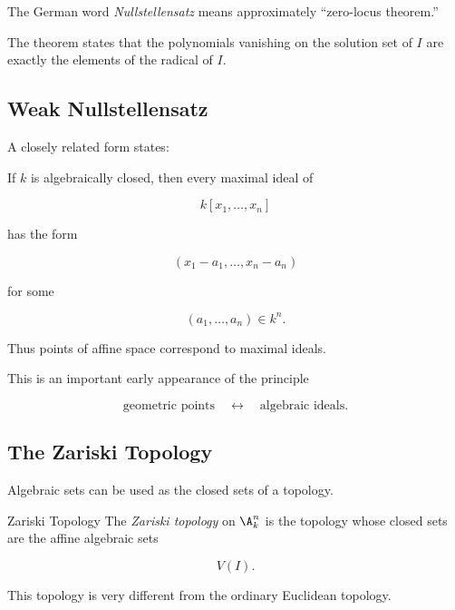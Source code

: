 The German word \emph{Nullstellensatz} means approximately ``zero-locus
theorem.''

The theorem states that the polynomials vanishing on the solution set of
\(I\) are exactly the elements of the radical of \(I\).

\subsection{Weak Nullstellensatz}
\label{subsec:weak-nullstellensatz}

A closely related form states:

\begin{theorem}
If \(k\) is algebraically closed, then every maximal ideal of

\[
k[x_1,\ldots,x_n]
\]

has the form

\[
\boxed{
(x_1-a_1,\ldots,x_n-a_n)
}
\]

for some

\[
(a_1,\ldots,a_n)\in k^n.
\]
\end{theorem}

Thus points of affine space correspond to maximal ideals.

This is an important early appearance of the principle

\[
\boxed{
\text{geometric points}
\quad\longleftrightarrow\quad
\text{algebraic ideals}.
}
\]

\subsection{The Zariski Topology}
\label{subsec:zariski-topology}

Algebraic sets can be used as the closed sets of a topology.

\begin{definitionbox}{Zariski Topology}
The \emph{Zariski topology} on \(\A^n_k\) is the topology whose closed sets
are the affine algebraic sets

\[
\boxed{
V(I).
}
\]
\end{definitionbox}

This topology is very different from the ordinary Euclidean topology.

